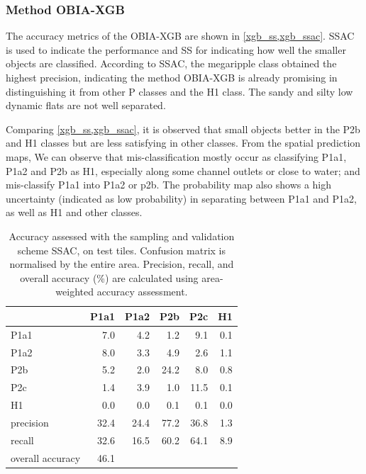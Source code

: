 \documentclass{isprs} %
\begin{document}
\subsubsection{Method OBIA-XGB}
The accuracy metrics of the OBIA-XGB are shown in \cref{xgb_ss,xgb_ssac}. SSAC is used to indicate the performance and SS for indicating how well the smaller objects are classified. According to SSAC, the megaripple class obtained the highest precision, indicating the method OBIA-XGB is already promising in distinguishing it from other P classes and the H1 class. The sandy and silty low dynamic flats are not well separated. 

Comparing \cref{xgb_ss,xgb_ssac}, it is observed that small objects better in the P2b and H1 classes but are less satisfying in other classes. From the spatial prediction maps, We can observe that mis-classification mostly occur as classifying P1a1, P1a2 and P2b as H1, especially along some channel outlets or close to water; and mis-classify P1a1 into P1a2 or p2b. The probability map also shows a high uncertainty (indicated as low probability) in separating between P1a1 and P1a2, as well as H1 and other classes.   

\begin{table}[]
    \centering
\begin{tabular}{lrrrrr}
\toprule
{} &  P1a1 &  P1a2 &  P2b &  P2c &  H1 \\
\midrule
P1a1             &   7.0 &   4.2 &  1.2 &  9.1 & 0.1 \\
P1a2             &   8.0 &   3.3 &  4.9 &  2.6 & 1.1 \\
P2b              &   5.2 &   2.0 & 24.2 &  8.0 & 0.8 \\
P2c              &   1.4 &   3.9 &  1.0 & 11.5 & 0.1 \\
H1               &   0.0 &   0.0 &  0.1 &  0.1 & 0.0 \\
precision        &  32.4 &  24.4 & 77.2 & 36.8 & 1.3 \\
recall           &  32.6 &  16.5 & 60.2 & 64.1 & 8.9 \\
overall accuracy &  46.1 &       &      &      &     \\
\bottomrule
\end{tabular}

\caption{Accuracy assessed with the sampling and validation scheme SSAC, on test tiles. Confusion matrix is normalised by the entire area. Precision, recall, and overall accuracy (\%) are calculated using area-weighted accuracy assessment.}
\label{xgb_ssac}
\end{table}
\end{document}
